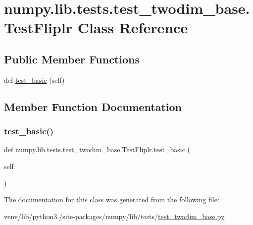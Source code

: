 \hypertarget{classnumpy_1_1lib_1_1tests_1_1test__twodim__base_1_1TestFliplr}{}\section{numpy.\+lib.\+tests.\+test\+\_\+twodim\+\_\+base.\+Test\+Fliplr Class Reference}
\label{classnumpy_1_1lib_1_1tests_1_1test__twodim__base_1_1TestFliplr}
\subsection*{Public Member Functions}
\begin{DoxyCompactItemize}
\item 
def \hyperlink{classnumpy_1_1lib_1_1tests_1_1test__twodim__base_1_1TestFliplr_ad6ae103cf4597b5a3b659180bb4dc257}{test\+\_\+basic} (self)
\end{DoxyCompactItemize}


\subsection{Member Function Documentation}
\mbox{\label{classnumpy_1_1lib_1_1tests_1_1test__twodim__base_1_1TestFliplr_ad6ae103cf4597b5a3b659180bb4dc257}} 
\subsubsection{\texorpdfstring{test\+\_\+basic()}{test\_basic()}}
{\footnotesize\ttfamily def numpy.\+lib.\+tests.\+test\+\_\+twodim\+\_\+base.\+Test\+Fliplr.\+test\+\_\+basic (\begin{DoxyParamCaption}\item[{}]{self }\end{DoxyParamCaption})}



The documentation for this class was generated from the following file\+:\begin{DoxyCompactItemize}
\item 
venv/lib/python3./site-\/packages/numpy/lib/tests/\hyperlink{test__twodim__base_8py}{test\+\_\+twodim\+\_\+base.\+py}\end{DoxyCompactItemize}
